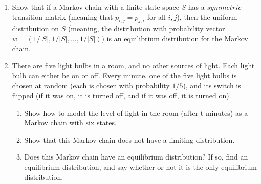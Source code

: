 \documentclass[11pt,a4paper]{report}
\begin{document}
\begin{enumerate}
        \item  Show that if a Markov chain with a finite state space $S$ has a $symmetric$ transition matrix (meaning that $p_{i,j} = p_{j,i}$ for all $i, j$), then the uniform distribution on $S$ (meaning, the distribution with probability vector $w = (1/|S|, 1/|S|, \ldots , 1/|S|))$ is an equilibrium distribution for the Markov chain.
        \item  There are five light bulbs in a room, and no other sources of light. Each light bulb can either be on or off. Every minute, one of the five light bulbs is chosen at random (each is chosen with probability $1/5$), and its switch is flipped (if it was on, it is turned off, and if it was off, it is turned on).
        \begin{enumerate}
            \item Show how to model the level of light in the room (after t minutes) as a Markov chain with six states.
            \item Show that this Markov chain does not have a limiting distribution.
            \item Does this Markov chain have an equilibrium distribution? If so, find an equilibrium distribution, and say whether or not it is the only equilibrium distribution.
        \end{enumerate}
        
    \end{enumerate}
\end{document}
